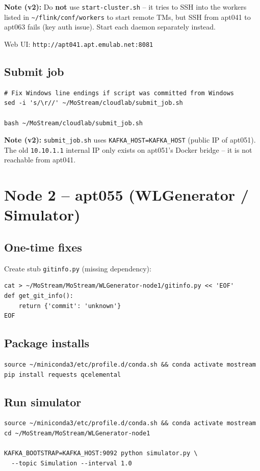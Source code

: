 \documentclass[11pt,a4paper]{article}
\begin{document}
\textbf{Note (v2):} Do \textbf{not} use \texttt{start-cluster.sh} -- it tries to SSH into
the workers listed in \texttt{\textasciitilde/flink/conf/workers} to start remote TMs, but
SSH from apt041 to apt063 fails (key auth issue). Start each daemon separately instead.

Web UI: \texttt{http://apt041.apt.emulab.net:8081}

\subsection{Submit job}
\begin{lstlisting}
# Fix Windows line endings if script was committed from Windows
sed -i 's/\r//' ~/MoStream/cloudlab/submit_job.sh

bash ~/MoStream/cloudlab/submit_job.sh
\end{lstlisting}

\textbf{Note (v2):} \texttt{submit\_job.sh} uses \texttt{KAFKA\_HOST=KAFKA_HOST}
(public IP of apt051). The old \texttt{10.10.1.1} internal IP only exists on apt051's
Docker bridge -- it is not reachable from apt041.

\section{Node 2 -- apt055 (WLGenerator / Simulator)}

\subsection{One-time fixes}

Create stub \texttt{gitinfo.py} (missing dependency):
\begin{lstlisting}
cat > ~/MoStream/MoStream/WLGenerator-node1/gitinfo.py << 'EOF'
def get_git_info():
    return {'commit': 'unknown'}
EOF
\end{lstlisting}

\subsection{Package installs}
\begin{lstlisting}
source ~/miniconda3/etc/profile.d/conda.sh && conda activate mostream
pip install requests qcelemental
\end{lstlisting}

\subsection{Run simulator}
\begin{lstlisting}
source ~/miniconda3/etc/profile.d/conda.sh && conda activate mostream
cd ~/MoStream/MoStream/WLGenerator-node1

KAFKA_BOOTSTRAP=KAFKA_HOST:9092 python simulator.py \
  --topic Simulation --interval 1.0
\end{lstlisting}
\end{document}
